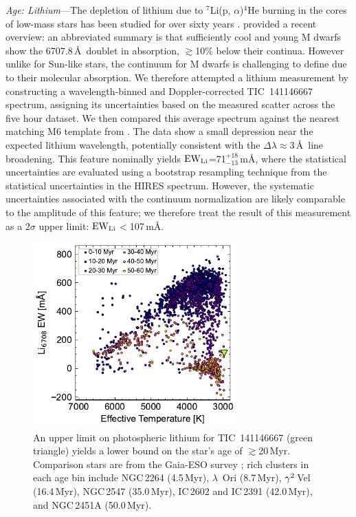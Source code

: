 \documentclass{nature3}
\begin{document}
\begin{methods}
{\it Age: Lithium}---The depletion of lithium due to $^7$Li(p,
$\alpha$)$^4$He burning in the cores of low-mass stars has been
studied for over sixty years
\cite{Hayashi1963,Bildsten1997,Burke2004}.  \cite{Wood2023} provided a
recent overview: an abbreviated summary is that sufficiently cool and
young M dwarfs show the 6707.8\,\AA\ doublet in absorption,
$\gtrsim$10\% below their continua.  However unlike for Sun-like
stars, the continuum for M dwarfs is challenging to define due to
their molecular absorption.  We therefore attempted a lithium
measurement by constructing a wavelength-binned and Doppler-corrected
TIC~141146667 spectrum, assigning its uncertainties based on the
measured scatter across the five hour dataset.  We then compared this
average spectrum against the nearest matching M6 template from
\cite{Bochanski2007}.  The data show a small depression near the
expected lithium wavelength, potentially consistent with the $\Delta
\lambda$$\approx$3\,\AA\ line broadening.  This feature nominally
yields ${\rm EW}_{\rm Li}$=71$^{+18}_{-13}$\,m\AA, where the
statistical uncertainties are evaluated using a bootstrap resampling
technique from the statistical uncertainties in the HIRES spectrum.
However, the systematic uncertainties associated with the continuum
normalization are likely comparable to the amplitude of this feature;
we therefore treat the result of this measurement as a $2\sigma$ upper
limit: ${\rm EW}_{\rm Li}$$<$107\,m\AA.


\begin{figure}[!t]
  \centering
  \includegraphics[width=0.7\textwidth]{figures/sf2.pdf}
  \caption{An upper limit on photospheric lithium for TIC~141146667
  (green triangle) yields a lower bound on the star's age of
  $\gtrsim$20\,Myr.  Comparison stars are from the Gaia-ESO survey
  \cite{Jeffries2023}; rich clusters in each age bin include NGC\,2264
  (4.5\,Myr), $\lambda$~Ori (8.7\,Myr), ${\rm \gamma}^2$\,Vel
  (16.4\,Myr), NGC\,2547 (35.0\,Myr), IC\,2602 and IC\,2391 (42.0\,Myr),
  and NGC\,2451A (50.0\,Myr). }
  \label{fig:liew_population}
\end{figure}




\end{methods}
\end{document}
